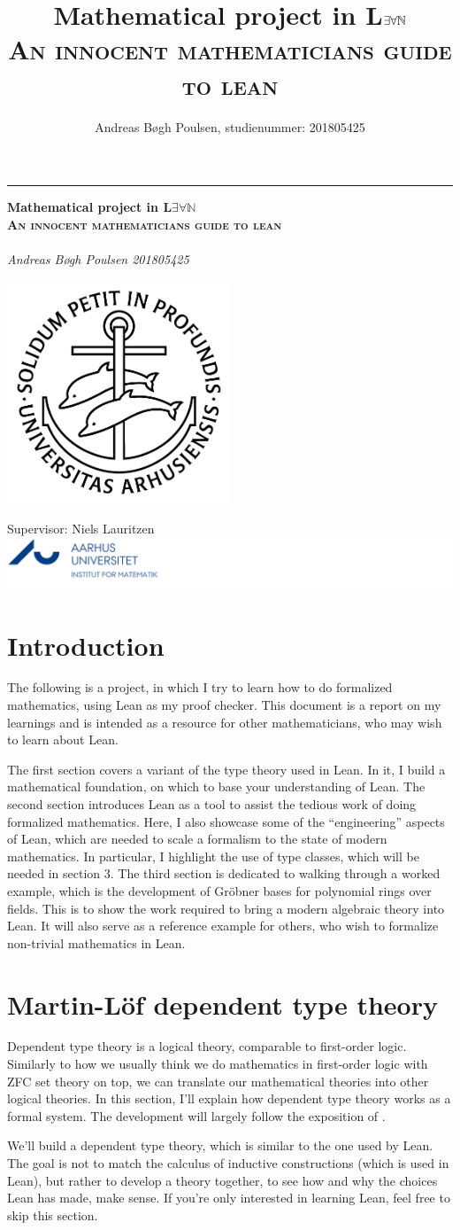 \documentclass[a4paper, 12pt]{article}
\title{Mathematical project in \textsf{L$\exists \forall\N$}\\{\large \textsc{An innocent mathematicians guide to lean}}}
\author{Andreas Bøgh Poulsen, studienummer: 201805425}
\newcommand{\N}{\mathbb{N}}
\theoremstyle{changedot}
\theoremstyle{changedotbreak}
\theoremstyle{nonumberplain}
\newcommand*{\titleGM}{%
\hspace*{0.2\textwidth} %
\rule{1pt}{\textheight} %
\hspace*{0.05\textwidth} %
\parbox[b]{0.75\textwidth}{ %
{\noindent\Huge\bfseries  Mathematical project in \textsf{L$\exists \forall\N$}\\{\large \textsc{An innocent mathematicians guide to lean}}\\}\\[2\baselineskip] %
{\large \textit{Andreas Bøgh Poulsen \hfill 201805425 }}\\%
{\large } %
\parbox[b][0pt]{0.5\textwidth}{
  \hspace{2cm}\includegraphics[width=0.5\textwidth]{ausegl_sort.png}
  \vspace{-10cm}
}

\vspace{0.5\textheight} %
\vfill
{\noindent Supervisor: Niels Lauritzen \hspace{2.5cm} \includegraphics{AU_logo.png}  }\\[\baselineskip] %
}%
}
\begin{document}
\titleGM
\newpage
\tableofcontents

\newpage

\section*{Introduction}
The following is a project, in which I try to learn how to do formalized mathematics, using Lean as my proof checker. This document is a report on my learnings and is intended as a resource for other mathematicians, who may wish to learn about Lean.

The first section covers a variant of the type theory used in Lean. In it, I build a mathematical foundation, on which to base your understanding of Lean. The second section introduces Lean as a tool to assist the tedious work of doing formalized mathematics. Here, I also showcase some of the ``engineering'' aspects of Lean, which are needed to scale a formalism to the state of modern mathematics. In particular, I highlight the use of type classes, which will be needed in section 3. The third section is dedicated to walking through a worked example, which is the development of Gröbner bases for polynomial rings over fields. This is to show the work required to bring a modern algebraic theory into Lean. It will also serve as a reference example for others, who wish to formalize non-trivial mathematics in Lean.

\section{Martin-Löf dependent type theory}\label{sec:tt}
Dependent type theory is a logical theory, comparable to first-order logic. Similarly to how we usually think we do mathematics in first-order logic with ZFC set theory on top, we can translate our mathematical theories into other logical theories. In this section, I'll explain how dependent type theory works as a formal system. The development will largely follow the exposition of \cite{rijke2022introduction}.

We'll build a dependent type theory, which is similar to the one used by Lean. The goal is not to match the calculus of inductive constructions (which is used in Lean), but rather to develop a theory together, to see how and why the choices Lean has made, make sense. If you're only interested in learning Lean, feel free to skip this section.
\end{document}
